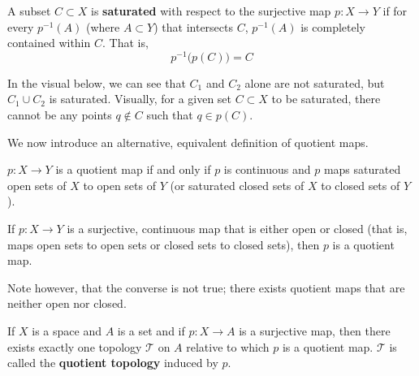 \documentclass{article}
\begin{document}
    \begin{definition}
    A subset $C \subset X$ is \textbf{saturated} with respect to the surjective map $p: X \longrightarrow Y$ if for every $p^{-1} (A)$ (where $A \subset Y$) that intersects $C$, $p^{-1}(A)$ is completely contained within $C$. That is, 
    \[p^{-1} \big( p(C) \big) = C\]
    \end{definition}

    In the visual below, we can see that $C_1$ and $C_2$ alone are not saturated, but $C_1 \cup C_2$ is saturated. Visually, for a given set $C \subset X$ to be saturated, there cannot be any points $q \not\in C$ such that $q \in p(C)$. 

    \begin{center}
    \end{center}
    We now introduce an alternative, equivalent definition of quotient maps. 

    \begin{definition}
    $p: X \longrightarrow Y$ is a quotient map if and only if $p$ is continuous and $p$ maps saturated open sets of $X$ to open sets of $Y$ (or saturated closed sets of $X$ to closed sets of $Y$). 
    \end{definition}

    \begin{proposition}
    If $p: X \longrightarrow Y$ is a surjective, continuous map that is either open or closed (that is, maps open sets to open sets or closed sets to closed sets), then $p$ is a quotient map. 

    Note however, that the converse is not true; there exists quotient maps that are neither open nor closed. 
    \end{proposition}

    \begin{definition}
    If $X$ is a space and $A$ is a set and if $p: X \longrightarrow A$ is a surjective map, then there exists exactly one topology $\mathscr{T}$ on $A$ relative to which $p$ is a quotient map. $\mathscr{T}$ is called the \textbf{quotient topology} induced by $p$. 
    \end{definition}
\end{document}
